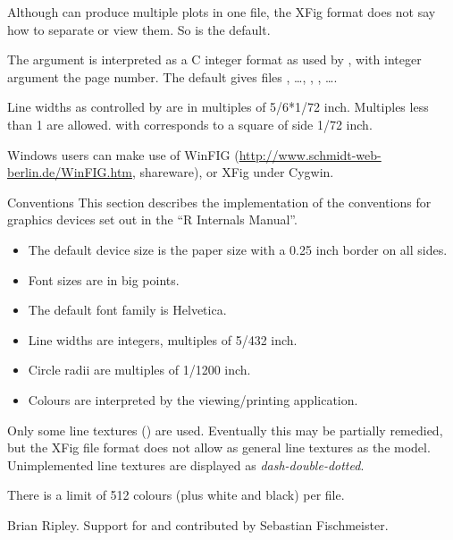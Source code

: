 %
\begin{Details}\relax
Although  can produce multiple plots in one file, the XFig
format does not say how to separate or view them.  So
 is the default.

The  argument is interpreted as a C integer format as used
by , with integer argument the page number.
The default gives files , \dots, ,
, \dots.  

Line widths as controlled by  are in multiples of
5/6*1/72 inch.  Multiples less than 1 are allowed.   with
 corresponds to a square of side 1/72 inch.  

Windows users can make use of WinFIG
(\url{http://www.schmidt-web-berlin.de/WinFIG.htm}, shareware), or
XFig under Cygwin.
\end{Details}
%
\begin{Section}{Conventions}
This section describes the implementation of the conventions for
graphics devices set out in the ``R Internals Manual''.

\begin{itemize}

\item The default device size is the paper size with a 0.25 inch
border on all sides.
\item Font sizes are in big points.
\item The default font family is Helvetica.
\item Line widths are integers, multiples of 5/432 inch.
\item Circle radii are multiples of 1/1200 inch.
\item Colours are interpreted by the viewing/printing application.

\end{itemize}

\end{Section}
%
\begin{Note}\relax
Only some line textures () are used.  Eventually this
may be partially remedied, but the XFig file format does not allow as
general line textures as the \R{} model.  Unimplemented line textures
are displayed as \emph{dash-double-dotted}.

There is a limit of 512 colours (plus white and black) per file.
\end{Note}
%
\begin{Author}\relax
Brian Ripley.  Support for  and 
contributed by Sebastian Fischmeister.
\end{Author}
